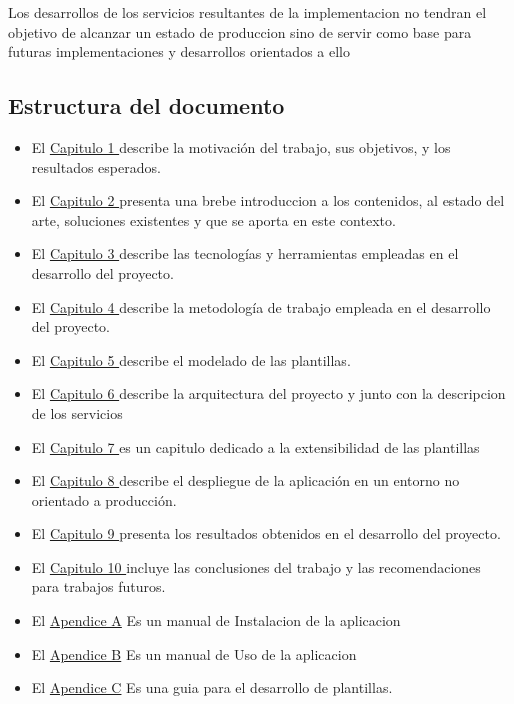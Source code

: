 \documentclass[12pt, a4paper, twoside]{article}
\begin{document}
Los desarrollos de los servicios resultantes de la implementacion no tendran el objetivo de alcanzar un estado de produccion sino de servir como base para futuras implementaciones y desarrollos orientados a ello 

\subsection{Estructura del documento}

\begin{itemize}[label=\textbullet]
	\item El \hyperref[sec:Introduccion]{Capitulo 1 } describe la motivación del trabajo, sus objetivos, y los resultados esperados.
	\item El \hyperref[sec:Estado del Arte]{Capitulo 2 } presenta una brebe introduccion a los contenidos, al estado del arte, soluciones existentes y que se aporta en este contexto.
	\item El \hyperref[sec:Tecnologias Empleadas]{Capitulo 3 } describe las tecnologías y herramientas empleadas en el desarrollo del proyecto.
	\item El \hyperref[sec:Metodologia]{Capitulo 4 } describe la metodología de trabajo empleada en el desarrollo del proyecto.
	\item El \hyperref[sec:Modelado de las plantillas]{Capitulo 5 } describe el modelado de las plantillas.
	\item El \hyperref[sec:Arquitectura y Descripcion del sistema]{Capitulo 6 } describe la arquitectura del proyecto y junto con la descripcion de los servicios
	\item El \hyperref[sec:Extensibilidad]{Capitulo 7 } es un capitulo dedicado a la extensibilidad de las plantillas
	\item El \hyperref[sec:Despliegue de la aplicación]{Capitulo 8 }  describe el despliegue de la aplicación en un entorno no orientado a producción.
	\item El \hyperref[sec:Resultados]{Capitulo 9 } presenta los resultados obtenidos en el desarrollo del proyecto.
	\item El \hyperref[sec:Conclusiones]{Capitulo 10 } incluye las conclusiones del trabajo y las recomendaciones para trabajos futuros.
	\item El \hyperref[sec:Manual de Instalación]{Apendice A} Es un manual de Instalacion de la aplicacion
	\item El \hyperref[sec:Manual de Uso]{Apendice B} Es un manual de Uso de la aplicacion
	\item El \hyperref[sec:Manual de Desarrollo]{Apendice C} Es una guia para el desarrollo de plantillas.
\end{itemize}
\end{document}
